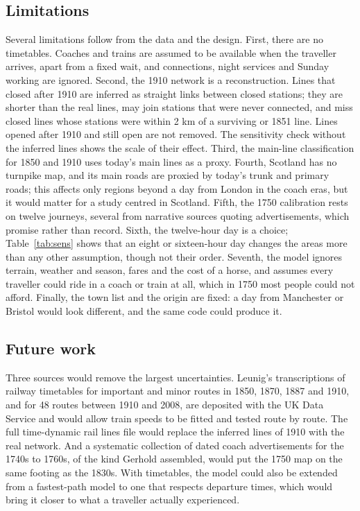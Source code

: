 \documentclass[11pt,a4paper]{article}
\begin{document}
\subsection{Limitations}
Several limitations follow from the data and the design. First, there are no timetables. Coaches and trains are assumed to be available when the traveller arrives, apart from a fixed wait, and connections, night services and Sunday working are ignored. Second, the 1910 network is a reconstruction. Lines that closed after 1910 are inferred as straight links between closed stations; they are shorter than the real lines, may join stations that were never connected, and miss closed lines whose stations were within 2 km of a surviving or 1851 line. Lines opened after 1910 and still open are not removed. The sensitivity check without the inferred lines shows the scale of their effect. Third, the main-line classification for 1850 and 1910 uses today's main lines as a proxy. Fourth, Scotland has no turnpike map, and its main roads are proxied by today's trunk and primary roads; this affects only regions beyond a day from London in the coach eras, but it would matter for a study centred in Scotland. Fifth, the 1750 calibration rests on twelve journeys, several from narrative sources quoting advertisements, which promise rather than record. Sixth, the twelve-hour day is a choice; Table~\ref{tab:sens} shows that an eight or sixteen-hour day changes the areas more than any other assumption, though not their order. Seventh, the model ignores terrain, weather and season, fares and the cost of a horse, and assumes every traveller could ride in a coach or train at all, which in 1750 most people could not afford. Finally, the town list and the origin are fixed: a day from Manchester or Bristol would look different, and the same code could produce it.

\subsection{Future work}
Three sources would remove the largest uncertainties. Leunig's transcriptions of railway timetables for important and minor routes in 1850, 1870, 1887 and 1910, and for 48 routes between 1910 and 2008, are deposited with the UK Data Service and would allow train speeds to be fitted and tested route by route. The full time-dynamic rail lines file would replace the inferred lines of 1910 with the real network. And a systematic collection of dated coach advertisements for the 1740s to 1760s, of the kind Gerhold assembled, would put the 1750 map on the same footing as the 1830s. With timetables, the model could also be extended from a fastest-path model to one that respects departure times, which would bring it closer to what a traveller actually experienced.
\end{document}
